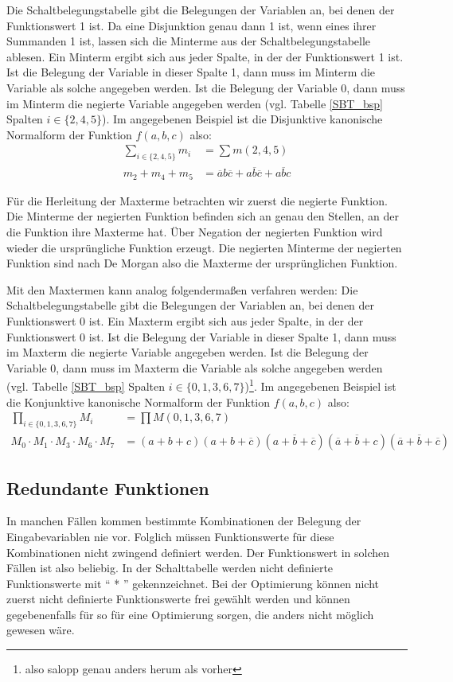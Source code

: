 \documentclass[11pt,a4paper]{scrreprt}
\begin{document}
Die Schaltbelegungstabelle gibt die Belegungen der Variablen an, bei denen der Funktionswert 1 ist. Da eine Disjunktion genau dann 1 ist, wenn eines ihrer Summanden 1 ist, lassen sich die Minterme aus der Schaltbelegungstabelle ablesen. Ein Minterm ergibt sich aus jeder Spalte, in der der Funktionswert 1 ist. Ist die Belegung der Variable in dieser Spalte 1, dann muss im Minterm die Variable als solche angegeben werden. Ist die Belegung der Variable 0, dann muss im Minterm die negierte Variable angegeben werden (vgl. Tabelle \ref{SBT_bsp} Spalten $i \in \{2, 4, 5\}$). Im angegebenen Beispiel ist die Disjunktive kanonische Normalform der Funktion $f(a,b,c)$ also:
\begin{align*}
 \sum_{i \in \{2, 4, 5\}} m_i &= \sum m(2, 4, 5) \\
m_2 + m_4 + m_5 &= \overline{a}b\overline{c} + a\overline{b}\overline{c} + a\overline{b}c
\end{align*}

Für die Herleitung der Maxterme betrachten wir zuerst die negierte Funktion. Die Minterme der negierten Funktion befinden sich an genau den Stellen, an der die Funktion ihre Maxterme hat. Über Negation der negierten Funktion wird wieder die ursprüngliche Funktion erzeugt. Die negierten Minterme der negierten Funktion sind nach De Morgan also die Maxterme der ursprünglichen Funktion.

Mit den Maxtermen kann analog folgendermaßen verfahren werden: Die Schaltbelegungstabelle gibt die Belegungen der Variablen an, bei denen der Funktionswert 0 ist. Ein Maxterm ergibt sich aus jeder Spalte, in der der Funktionswert 0 ist. Ist die Belegung der Variable in dieser Spalte 1, dann muss im Maxterm die negierte Variable angegeben werden. Ist die Belegung der Variable 0, dann muss im Maxterm die Variable als solche angegeben werden (vgl. Tabelle \ref{SBT_bsp} Spalten $i \in \{0, 1, 3, 6, 7\}$)\footnote{also salopp genau anders herum als vorher}. Im angegebenen Beispiel ist die Konjunktive kanonische Normalform der Funktion $f(a,b,c)$ also:
\begin{align*}
 \prod_{i \in \{0, 1, 3, 6, 7\}} M_i &= \prod M(0, 1, 3, 6, 7) \\
M_0 \cdot M_1 \cdot M_3 \cdot M_6 \cdot M_7 &= (a + b + c)(a + b + \overline{c})(a + \overline{b} + \overline{c})(\overline{a} + \overline{b} + c)(\overline{a} + \overline{b} + \overline{c})
\end{align*}

\subsection{Redundante Funktionen}
In manchen Fällen kommen bestimmte Kombinationen der Belegung der Eingabevariablen nie vor. Folglich müssen Funktionswerte für diese Kombinationen nicht zwingend definiert werden. Der Funktionswert in solchen Fällen ist also beliebig. In der Schalttabelle werden nicht definierte Funktionswerte mit "` * "' gekennzeichnet. Bei der Optimierung können nicht zuerst nicht definierte Funktionswerte frei gewählt werden und können gegebenenfalls für so für eine Optimierung sorgen, die anders nicht möglich gewesen wäre.
\end{document}
